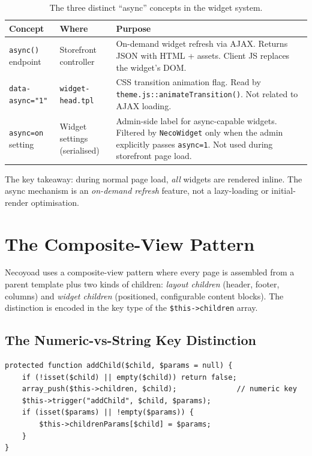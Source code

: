 \documentclass[11pt,a4paper]{article}
\begin{document}
\begin{table}[htbp]
\centering
\caption{The three distinct ``async'' concepts in the widget system.}\label{tab:async-three}
\footnotesize\sloppy
\begin{tabularx}{\columnwidth}{>{\raggedright\arraybackslash}p{2.8cm}lX}
\toprule
\textbf{Concept} & \textbf{Where} & \textbf{Purpose} \\
\midrule
\texttt{async()} endpoint & Storefront controller & On-demand widget refresh via AJAX. Returns JSON with HTML + assets. Client JS replaces the widget's DOM. \\
\texttt{data-async="1"} & \texttt{widget-head.tpl} & CSS transition animation flag. Read by \texttt{theme.js::animateTransition()}. Not related to AJAX loading. \\
\texttt{async=on} setting & Widget settings (serialised) & Admin-side label for async-capable widgets. Filtered by \texttt{NecoWidget} only when the admin explicitly passes \texttt{async=1}. Not used during storefront page load. \\
\bottomrule
\end{tabularx}
\end{table}

The key takeaway: during normal page load, \emph{all} widgets are
rendered inline. The async mechanism is an \emph{on-demand refresh}
feature, not a lazy-loading or initial-render optimisation.

\section{The Composite-View Pattern}\label{sec:composite-view}

Necoyoad uses a composite-view pattern where every page is
assembled from a parent template plus two kinds of children:
\emph{layout children} (header, footer, columns) and \emph{widget
children} (positioned, configurable content blocks). The
distinction is encoded in the key type of the
\texttt{\$this->children} array.

\subsection{The Numeric-vs-String Key Distinction}

\begin{lstlisting}[caption={\texttt{addChild()} --- layout children get numeric keys.},label={lst:addchild}]
protected function addChild($child, $params = null) {
    if (!isset($child) || empty($child)) return false;
    array_push($this->children, $child);              // numeric key
    $this->trigger("addChild", $child, $params);
    if (isset($params) || !empty($params)) {
        $this->childrenParams[$child] = $params;
    }
}
\end{lstlisting}
\end{document}
